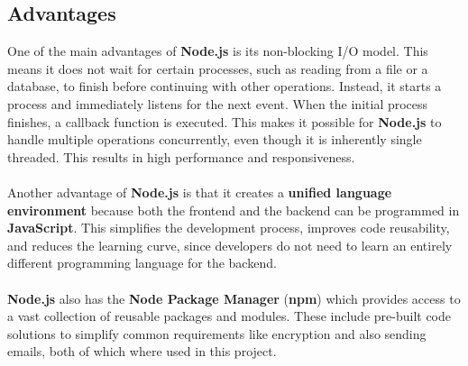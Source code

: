 \documentclass[a4paper,12pt]{report}
\begin{document}
\subsection{Advantages}  
One of the main advantages of \textbf{Node.js} is its non-blocking I/O model. This means it does not wait for certain processes, such as reading from a file or a database, to finish before continuing with other operations. Instead, it starts a process and immediately listens for the next event. When the initial process finishes, a callback function is executed. This makes it possible for \textbf{Node.js} to handle multiple operations concurrently, even though it is inherently single threaded. This results in high performance and responsiveness.\parencite{nodejs-nonblocking}\\\\
Another advantage of \textbf{Node.js} is that it creates a \textbf{unified language environment} because both the frontend and the backend can be programmed in \textbf{JavaScript}. This simplifies the development process, improves code reusability, and reduces the learning curve, since developers do not need to learn an entirely different programming language for the backend.\\\\
\textbf{Node.js} also has the \textbf{Node Package Manager} (\textbf{npm}) which provides access to a vast collection of reusable packages and modules. These include pre-built code solutions to simplify common requirements like encryption and also sending emails, both of which where used in this project.\parencite{mdn-express-nodejs}
\end{document}
